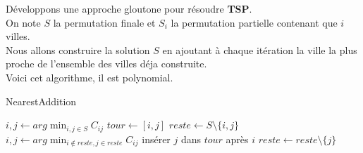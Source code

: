 \documentclass[12pt]{article}
\newcommand{\titre}[1]{\textcolor{title}{#1}}
\begin{document}
Développons une approche gloutone pour résoudre \textbf{\titre{TSP}}.\\
On note $S$ la permutation finale et $S_i$ la permutation partielle contenant que $i$ villes.\\
Nous allons construire la solution $S$ en ajoutant à chaque itération la ville la plus proche de l'ensemble des villes déja construite.\\
Voici cet algorithme, il est polynomial.

\begin{algorithm}[H]
\caption{NearestAddition}
\begin{algorithmic}[1]
\STATE $i,j \leftarrow arg\min_{i,j\in S} C_{ij}$
\STATE $tour \leftarrow [i,j]$
\STATE $reste \leftarrow S \setminus \{i,j\}$
\STATE $i,j \leftarrow arg\min_{i\not\in reste,j\in reste} C_{ij}$
\STATE insérer $j$ dans $tour$ après $i$
\STATE $reste\leftarrow reste\setminus\{j\}$
\ENDWHILE
\end{algorithmic}
\end{algorithm}
\end{document}
